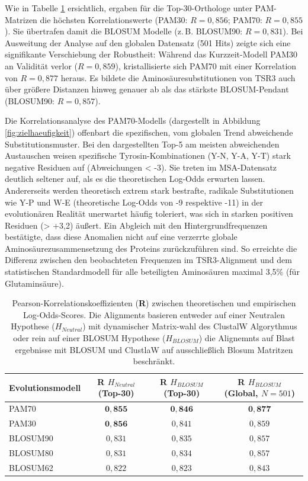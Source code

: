 \documentclass[11pt, a4paper]{article}
\begin{document}
Wie in Tabelle \ref{tab:korrelation} ersichtlich, ergaben für die Top-30-Orthologe unter PAM-Matrizen die höchsten Korrelationswerte (PAM30: $R=0{,}856$; PAM70: $R=0{,}855$). Sie übertrafen damit die BLOSUM Modelle (z.\,B. BLOSUM90: $R=0{,}831$). Bei Ausweitung der Analyse auf den globalen Datensatz (501 Hits) zeigte sich eine signifikante Verschiebung der Robustheit: Während das Kurzzeit-Modell PAM30 an Validität verlor ($R=0{,}859$), kristallisierte sich PAM70 mit einer Korrelation von $R=0{,}877$ heraus. Es bildete die Aminosäuresubstitutionen von TSR3 auch über größere Distanzen hinweg genauer ab als das stärkste BLOSUM-Pendant (BLOSUM90: $R=0{,}857$). 

Die Korrelationsanalyse des PAM70-Modells (dargestellt in Abbildung \ref{fig:zielhaeufigkeit}) offenbart die spezifischen, vom globalen Trend abweichende Substitutionsmuster. Bei den dargestellten Top-5 am meisten abweichenden Austauschen weisen spezifische Tyrosin-Kombinationen (Y-N, Y-A, Y-T) stark negative Residuen auf (Abweichungen < -3). Sie treten im MSA-Datensatz deutlich seltener auf, als es die theoretischen Log-Odds erwarten lassen. Andererseits werden theoretisch extrem stark bestrafte, radikale Substitutionen wie Y-P und W-E (theoretische Log-Odds von -9 respektive -11) in der evolutionären Realität unerwartet häufig toleriert, was sich in starken positiven Residuen (> +3,2) äußert. Ein Abgleich mit den Hintergrundfrequenzen bestätigte, dass diese Anomalien nicht auf eine verzerrte globale Aminosäurezusammensetzung des Proteins zurückzuführen sind. So erreichte die Differenz zwischen den beobachteten Frequenzen im TSR3-Alignment und dem statistischen Standardmodell für alle beteiligten Aminosäuren maximal 3,5\% (für Glutaminsäure).

\begin{table}[htbp]
    \centering
    \begin{tabular}{lccc}
        \toprule
        \textbf{Evolutionsmodell} & \textbf{R $H_{Neutral}$ (Top-30)} & \textbf{R $H_{BLOSUM}$ (Top-30)} & \textbf{R $H_{BLOSUM}$ (Global, $N=501$)} \\
        \midrule
        PAM70     & $\mathbf{0{,}855}$ & $\mathbf{0{,}846}$ & $\mathbf{0{,}877}$ \\
        PAM30     & $\mathbf{0{,}856}$ & $0{,}841$          & $0{,}859$ \\
        BLOSUM90  & $0{,}831$          & $0{,}835$          & $0{,}857$ \\
        BLOSUM80  & $0{,}831$          & $0{,}834$          & $0{,}857$ \\
        BLOSUM62  & $0{,}822$          & $0{,}823$          & $0{,}843$ \\
        \bottomrule
    \end{tabular}
    \caption{Pearson-Korrelationskoeffizienten (\textbf{R}) zwischen theoretischen und empirischen Log-Odds-Scores. Die Alignments basieren entweder auf
    einer Neutralen Hypothese ($H_{Neutral}$) mit dynamischer Matrix-wahl des ClustalW Algorythmus oder rein auf einer BLOSUM Hypothese ($H_{BLOSUM}$)
    die Alignemnts auf Blast ergebnisse mit BLOSUM und ClustlaW auf ausschließlich Blosum Matritzen beschränkt.}
    \label{tab:korrelation}
\end{table}
\end{document}
